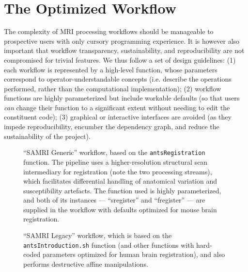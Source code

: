 \section{The Optimized Workflow}
The complexity of MRI processing workflows should be manageable to prospective users with only cursory programming experience.
It is however also important that workflow transparency, sustainability, and reproducibility are not compromised for trivial features.
We thus follow  a set of design guidelines:
(1) each workflow is represented by a high-level function, whose parameters correspond to operator-understandable concepts (i.e. describe the operations performed, rather than the computational implementation);
(2) workflow functions are highly parameterized but include workable defaults (so that users \textit{can} change their function to a significant extent without needing to edit the constituent code);
(3) graphical or interactive interfaces are avoided (as they impede reproducibility, encumber the dependency graph, and reduce the sustainability of the project).

\begin{figure*}[h!]
	\begin{subfigure}{.64\textwidth}
		\centering
		\vspace{1.4em}
		\caption{
			“SAMRI Generic”  workflow, based on the \textcolor{mg}{\texttt{antsRegistration}} function.
			The pipeline uses a higher-resolution structural scan intermediary for registration (note the two processing streams), which facilitates differential handling of anatomical variation and susceptibility artefacts.
			The function used is highly parameterized, and both of its instances --- “s\niceus register” and “f\niceus register” --- are supplied in the workflow with defaults optimized for mouse brain registration.
			}
		\label{fig:wfgg}
	\end{subfigure}\hfill
	\begin{subfigure}{.34\textwidth}
		\centering
		\vspace{-1.9em}
		\caption{
			“SAMRI Legacy” workflow, which is based on the \textcolor{mg}{\texttt{antsIntroduction.sh}} function (and other functions with hard-coded parameters optimized for human brain registration), and also performs destructive affine manipulations.
			}
		\label{fig:wfgl}
	\end{subfigure}
	\caption{
		\textbf{The SAMRI workflow consitutes a functional to structural registration workflow.}
		Shown are directed acyclic graphs depicting the two alternate MRI registration workflows and their constituent processing steps.
		The package correspondence of each processing node is appended in parantheses to the node name.
		The “utility” indication corresponds to nodes based on Python functions specific to the workflow, distributed alongside it, and dynamically wrapped via Nipype.
		The “extra\niceus interfaces” indication corresponds to nodes using explicitly defined Nipype-style interfaces, which are specific to the workflow and distributed alongside it.
		}
	\label{fig:wfg}
\end{figure*}

